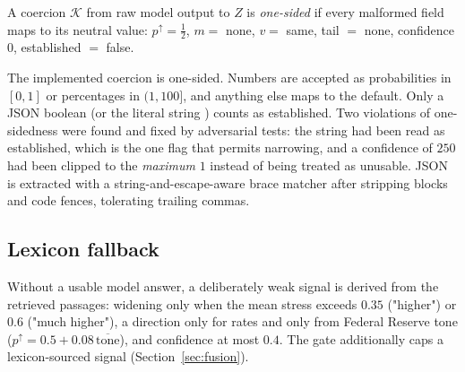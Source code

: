 \begin{definition}
A coercion $\mathcal K$ from raw model output to $Z$ is \emph{one-sided} if every malformed field maps to its neutral value: $p^\uparrow=\tfrac12$,
$m=$ none, $v=$ same, tail $=$ none, confidence $0$, established $=$ false.
\end{definition}
The implemented coercion is one-sided. Numbers are accepted as probabilities in $[0,1]$ or percentages in $(1,100]$, and anything else maps to
the default. Only a JSON boolean  (or the literal string ) counts as established. Two violations of one-sidedness were found
and fixed by adversarial tests: the string  had been read as established, which is the one flag that permits narrowing, and a
confidence of $250$ had been clipped to the \emph{maximum} $1$ instead of being treated as unusable. JSON is extracted with a
string-and-escape-aware brace matcher after stripping  blocks and code fences, tolerating trailing commas.

\subsection{Lexicon fallback}

Without a usable model answer, a deliberately weak signal is derived from the retrieved passages: widening only when the mean stress exceeds
$0.35$ ("higher") or $0.6$ ("much higher"), a direction only for rates and only from Federal Reserve tone ($p^\uparrow=0.5+0.08\,\overline{\text{tone}}$),
and confidence at most $0.4$. The gate additionally caps a lexicon-sourced signal (Section~\ref{sec:fusion}).
